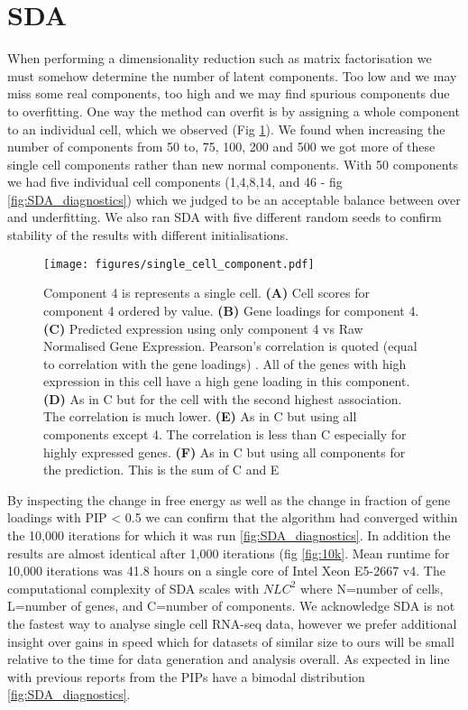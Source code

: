 \section{SDA}

When performing a dimensionality reduction such as matrix factorisation we must somehow determine the number of latent components. Too low and we may miss some real components, too high and we may find spurious components due to overfitting. One way the method can overfit is by assigning a whole component to an individual cell, which we observed (Fig \ref{fig:single_cell_component}). We found when increasing the number of components from 50 to, 75, 100, 200 and 500 we got more of these single cell components rather than new normal components. With 50 components we had five individual cell components (1,4,8,14, and 46 - fig \ref{fig:SDA_diagnostics}) which we judged to be an acceptable balance between over and underfitting. We also ran SDA with five different random seeds to confirm stability of the results with different initialisations.


\begin{figure}[H]
	\centering
	\texttt{[image: figures/single\_cell\_component.pdf]}
	\caption{Component 4 is represents a single cell.
		\textbf{(A)} Cell scores for component 4 ordered by value.
		\textbf{(B)} Gene loadings for component 4.
		\textbf{(C)} Predicted expression using only component 4 vs Raw Normalised Gene Expression. Pearson's correlation is quoted (equal to correlation with the gene loadings) . All of the genes with high expression in this cell have a high gene loading in this component.
		\textbf{(D)} As in C but for the cell with the second highest association. The correlation is much lower. 
		\textbf{(E)} As in C but using all components except 4. The correlation is less than C especially for highly expressed genes.
		\textbf{(F)} As in C but using all components for the prediction.  This is the sum of C and E
	}
	\label{fig:single_cell_component}
\end{figure}

By inspecting the change in free energy as well as the change in fraction of gene loadings with PIP < 0.5 we can confirm that the algorithm had converged within the 10,000 iterations for which it was run \ref{fig:SDA_diagnostics}. In addition the results are almost identical after 1,000 iterations (fig \ref{fig:10k}. Mean runtime for 10,000 iterations was 41.8 hours on a single core of Intel Xeon E5-2667 v4. The computational complexity of SDA scales with $NLC^2$ where N=number of cells, L=number of genes, and C=number of components. We acknowledge SDA is not the fastest way to analyse single cell RNA-seq data, however we prefer additional insight over gains in speed which for datasets of similar size to ours will be small relative to the time for data generation and analysis overall. As expected in line with previous reports from \cite{Hore2016Tensor} the PIPs have a bimodal distribution \ref{fig:SDA_diagnostics}.


